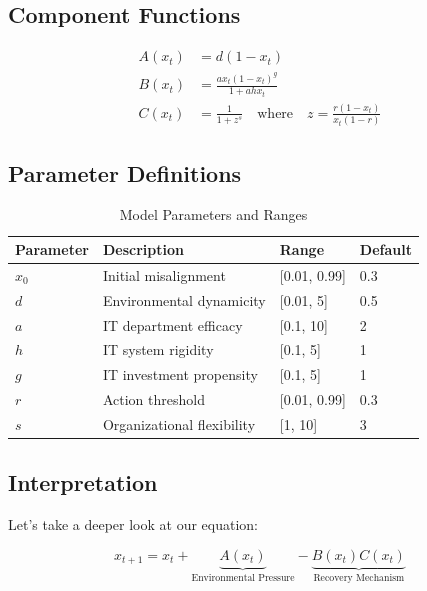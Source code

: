 \documentclass[a4paper, 11pt]{article}
\begin{document}
\subsection{Component Functions}
\begin{align}
	A(x_t) & = d(1 - x_t)                                                                     \\
	B(x_t) & = \frac{a x_t (1 - x_t)^g}{1 + a h x_t}                                          \\
	C(x_t) & = \frac{1}{1 + z^s} \quad \text{where} \quad z = \frac{r (1 - x_t)}{x_t (1 - r)}
\end{align}

\subsection{Parameter Definitions}
\begin{table}[h]
	\centering
	\caption{Model Parameters and Ranges}
	\begin{tabular}{llll}
		\toprule
		\textbf{Parameter} & \textbf{Description}       & \textbf{Range} & \textbf{Default} \\
		\midrule
		$x_0$              & Initial misalignment       & [0.01, 0.99]   & 0.3              \\
		$d$                & Environmental dynamicity   & [0.01, 5]      & 0.5              \\
		$a$                & IT department efficacy     & [0.1, 10]      & 2                \\
		$h$                & IT system rigidity         & [0.1, 5]       & 1                \\
		$g$                & IT investment propensity   & [0.1, 5]       & 1                \\
		$r$                & Action threshold           & [0.01, 0.99]   & 0.3              \\
		$s$                & Organizational flexibility & [1, 10]        & 3                \\
		\bottomrule
	\end{tabular}
\end{table}

\subsection{Interpretation}
Let's take a deeper look at our equation:

\begin{equation}
	x_{t + 1} = x_t + \underbrace{A(x_t)}_{\text{Environmental Pressure}} - \underbrace{B(x_t)C(x_t)}_{\text{Recovery Mechanism}}
\end{equation}
\end{document}
